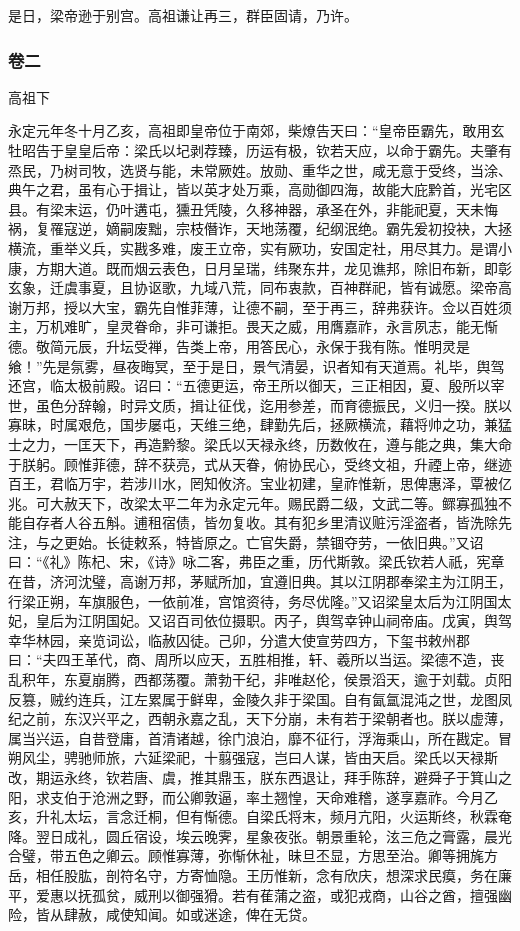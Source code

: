 \documentclass[]{article}
\begin{document}
是日，梁帝逊于别宫。高祖谦让再三，群臣固请，乃许。

\hypertarget{header-n4194}{%
\subsubsection{卷二}\label{header-n4194}}

高祖下

永定元年冬十月乙亥，高祖即皇帝位于南郊，柴燎告天曰：``皇帝臣霸先，敢用玄牡昭告于皇皇后帝：梁氏以圮剥荐臻，历运有极，钦若天应，以命于霸先。夫肇有烝民，乃树司牧，选贤与能，未常厥姓。放勋、重华之世，咸无意于受终，当涂、典午之君，虽有心于揖让，皆以英才处万乘，高勋御四海，故能大庇黔首，光宅区县。有梁末运，仍叶遘屯，獯丑凭陵，久移神器，承圣在外，非能祀夏，天未悔祸，复罹寇逆，嫡嗣废黜，宗枝僭诈，天地荡覆，纪纲泯绝。霸先爰初投袂，大拯横流，重举义兵，实戡多难，废王立帝，实有厥功，安国定社，用尽其力。是谓小康，方期大道。既而烟云表色，日月呈瑞，纬聚东井，龙见谯邦，除旧布新，即彰玄象，迁虞事夏，且协讴歌，九域八荒，同布衷款，百神群祀，皆有诚愿。梁帝高谢万邦，授以大宝，霸先自惟菲薄，让德不嗣，至于再三，辞弗获许。佥以百姓须主，万机难旷，皇灵眷命，非可谦拒。畏天之威，用膺嘉祚，永言夙志，能无惭德。敬简元辰，升坛受禅，告类上帝，用答民心，永保于我有陈。惟明灵是飨！''先是氛雾，昼夜晦冥，至于是日，景气清晏，识者知有天道焉。礼毕，舆驾还宫，临太极前殿。诏曰：``五德更运，帝王所以御天，三正相因，夏、殷所以宰世，虽色分辞翰，时异文质，揖让征伐，迄用参差，而育德振民，义归一揆。朕以寡昧，时属艰危，国步屡屯，天维三绝，肆勤先后，拯厥横流，藉将帅之功，兼猛士之力，一匡天下，再造黔黎。梁氏以天禄永终，历数攸在，遵与能之典，集大命于朕躬。顾惟菲德，辞不获亮，式从天眷，俯协民心，受终文祖，升禋上帝，继迹百王，君临万宇，若涉川水，罔知攸济。宝业初建，皇祚惟新，思俾惠泽，覃被亿兆。可大赦天下，改梁太平二年为永定元年。赐民爵二级，文武二等。鳏寡孤独不能自存者人谷五斛。逋租宿债，皆勿复收。其有犯乡里清议赃污淫盗者，皆洗除先注，与之更始。长徒敕系，特皆原之。亡官失爵，禁锢夺劳，一依旧典。''又诏曰：``《礼》陈杞、宋，《诗》咏二客，弗臣之重，历代斯敦。梁氏钦若人祇，宪章在昔，济河沈璧，高谢万邦，茅赋所加，宜遵旧典。其以江阴郡奉梁主为江阴王，行梁正朔，车旗服色，一依前准，宫馆资待，务尽优隆。''又诏梁皇太后为江阴国太妃，皇后为江阴国妃。又诏百司依位摄职。丙子，舆驾幸钟山祠帝庙。戊寅，舆驾幸华林园，亲览词讼，临赦囚徒。己卯，分遣大使宣劳四方，下玺书敕州郡曰：``夫四王革代，商、周所以应天，五胜相推，轩、羲所以当运。梁德不造，丧乱积年，东夏崩腾，西都荡覆。萧勃干纪，非唯赵伦，侯景滔天，逾于刘载。贞阳反篡，贼约连兵，江左累属于鲜卑，金陵久非于梁国。自有氤氲混沌之世，龙图凤纪之前，东汉兴平之，西朝永嘉之乱，天下分崩，未有若于梁朝者也。朕以虚薄，属当兴运，自昔登庸，首清诸越，徐门浪泊，靡不征行，浮海乘山，所在戡定。冒朔风尘，骋驰师旅，六延梁祀，十翦强寇，岂曰人谋，皆由天启。梁氏以天禄斯改，期运永终，钦若唐、虞，推其鼎玉，朕东西退让，拜手陈辞，避舜子于箕山之阳，求支伯于沧洲之野，而公卿敦逼，率土翘惶，天命难稽，遂享嘉祚。今月乙亥，升礼太坛，言念迁桐，但有惭德。自梁氏将末，频月亢阳，火运斯终，秋霖奄降。翌日成礼，圆丘宿设，埃云晚霁，星象夜张。朝景重轮，泫三危之膏露，晨光合璧，带五色之卿云。顾惟寡薄，弥惭休祉，昧旦丕显，方思至治。卿等拥旄方岳，相任股肱，剖符名守，方寄恤隐。王历惟新，念有欣庆，想深求民瘼，务在廉平，爱惠以抚孤贫，威刑以御强猾。若有萑蒲之盗，或犯戎商，山谷之酋，擅强幽险，皆从肆赦，咸使知闻。如或迷途，俾在无贷。
\end{document}
